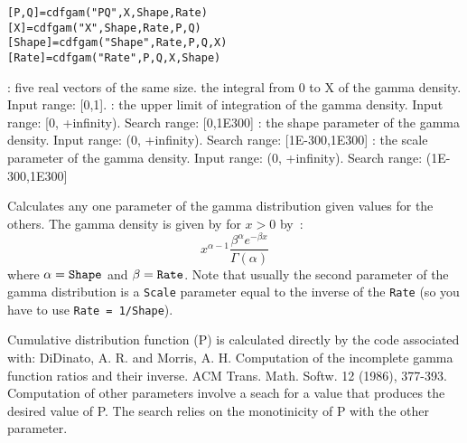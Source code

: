 \begin{mandesc}
\end{mandesc}
\label{cdfgam}
\begin{calling_sequence}
\begin{verbatim}
[P,Q]=cdfgam("PQ",X,Shape,Rate)  
[X]=cdfgam("X",Shape,Rate,P,Q)  
[Shape]=cdfgam("Shape",Rate,P,Q,X)  
[Rate]=cdfgam("Rate",P,Q,X,Shape)  
\end{verbatim}
\end{calling_sequence}
\begin{parameters}
  \begin{varlist}
    : five real vectors of the same size.
     the integral from 0 to X of the gamma density. Input range: [0,1].
    :  the upper limit of integration of the gamma density. Input range: [0, +infinity). Search range: [0,1E300]
      :  the shape parameter of the gamma density. Input range: (0, +infinity). Search range: [1E-300,1E300]
      :  the scale parameter of the gamma density. Input range: (0, +infinity). Search range: (1E-300,1E300]
  \end{varlist}
\end{parameters}
\begin{mandescription}
  Calculates any one parameter of the gamma distribution given values for the others.
  The gamma density is given by for $x>0$ by~:
  \begin{equation}
    x^{\alpha-1} \frac{ \beta^\alpha  e^{- \beta x}}{\Gamma(\alpha)}
  \end{equation}
  where $\alpha = \mbox{\tt Shape}$ and $\beta = \mbox{\tt Rate}$. 
  Note that usually the second parameter of the gamma distribution 
  is a \verb!Scale! parameter equal to the inverse of the \verb!Rate! 
  (so you have to use \verb!Rate = 1/Shape!).

  Cumulative distribution function (P) is calculated directly by
  the code associated with: DiDinato, A. R. and Morris, A. H. 
  Computation of the  incomplete
  gamma function  ratios  and their  inverse.   ACM  Trans.  Math.
  Softw. 12 (1986), 377-393.
  Computation of other parameters involve a seach for a value that
  produces  the desired  value  of P.   The search relies  on  the
  monotinicity of P with the other parameter.
\end{mandescription}

